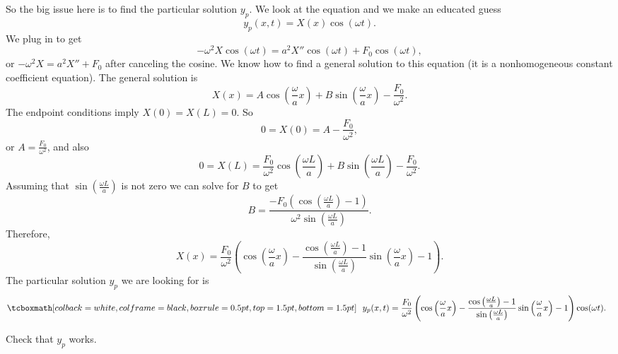 So the big issue here is to find the particular solution $y_p$.
We look at the equation and we make an educated guess
\begin{equation*}
y_p(x,t) = X(x) \cos (\omega t) .
\end{equation*}
We plug in to get
\begin{equation*}
-\omega^2 X \cos ( \omega t) = a^2 X'' \cos ( \omega t) +
F_0 \cos ( \omega t ) ,
\end{equation*}
or
$-\omega^2 X = a^2 X'' + F_0$ after canceling the cosine.
We know how to find a general solution to this equation (it is a
nonhomogeneous constant coefficient equation).
The general solution is
\begin{equation*}
X(x) = A \cos \left( \frac{\omega}{a} x \right)
+ B \sin \left( \frac{\omega}{a} x \right) -
\frac{F_0}{\omega^2} .
\end{equation*}
The endpoint conditions imply $X(0) = X(L) = 0$.  So
\begin{equation*}
0 = X(0) = A - \frac{F_0}{\omega^2} ,
\end{equation*}
or $A = \frac{F_0}{\omega^2}$, and also
\begin{equation*}
0 = X(L)
= \frac{F_0}{\omega^2} \cos \left( \frac{\omega L}{a} \right)
+ B \sin \left( \frac{\omega L}{a} \right) -
\frac{F_0}{\omega^2} .
\end{equation*}
Assuming that $\sin ( \frac{\omega L}{a} )$ is not zero we can solve for $B$ to
get
\begin{equation} \label{natfreq:Beq}
B = 
\frac{-F_0 \left( \cos \left( \frac{\omega L}{a} \right) - 1 \right)}%
{\omega^2 \sin \left( \frac{\omega L}{a} \right)}.
\end{equation}
Therefore,
\begin{equation*}
X(x) =
\frac{F_0}{\omega^2} \left(
\cos \left(  \frac{\omega}{a} x \right) -
\frac{\cos \left( \frac{\omega L}{a} \right) - 1}%
{\sin \left( \frac{\omega L}{a} \right)}
\sin \left( \frac{\omega}{a} x \right)
- 1
\right) .
\end{equation*}
The particular solution $y_p$ we are looking for is
\begin{equation*}
\mybxbg{~~
y_p(x,t) =
\frac{F_0}{\omega^2} \left(
\cos \left( \frac{\omega}{a} x \right) -
\frac{\cos \left( \frac{\omega L}{a} \right) - 1}%
{\sin \left( \frac{\omega L}{a}\right)}
\sin \left( \frac{\omega}{a} x \right)
-1
\right)
\cos ( \omega t) .
~~}
\end{equation*}

\begin{exercise}
Check that $y_p$ works.
\end{exercise}

